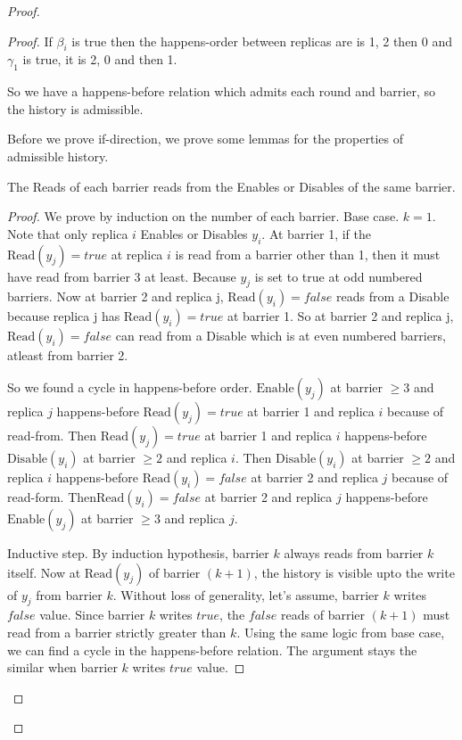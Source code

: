 \begin{proof}
\begin{proof}
    If $\beta_i$ is true then the happens-order between replicas are is 1, 2 then 0 and $\gamma_1$ is true, it is 2, 0 and then 1.

    So we have a happens-before relation which admits each round and barrier, so the history is admissible.

    Before we prove if-direction, we prove some lemmas for the properties of admissible history.

  \begin{lemma}
    \label{crdt:flag:npc-proof:lemma1}
    The \textrm{Read}s of each barrier reads from the \textrm{Enable}s or \textrm{Disable}s of the same barrier. 
  \end{lemma}

  \begin{proof}
    We prove by induction on the number of each barrier.
    Base case. $k = 1$. Note that only replica $i$ \textrm{Enable}s or \textrm{Disable}s $y_i$. At barrier 1, if the $\mathrm{Read}(y_j) = true$ at replica $i$ is read from a barrier other than 1, then it must have read from barrier 3 at least. Because $y_j$ is set to true at odd numbered barriers. Now at barrier 2 and replica j, $\mathrm{Read}(y_i) = false$ reads from a \textrm{Disable} because replica j has $\mathrm{Read}(y_i) = true$ at barrier 1. So at barrier 2 and replica j, $\mathrm{Read}(y_i) = false$ can read from a \textrm{Disable} which is at even numbered barriers, atleast from barrier 2.
    
    So we found a cycle in happens-before order. $\mathrm{Enable}(y_j)$ at barrier $\geq3$ and replica $j$ happens-before $\mathrm{Read}(y_j) = true$ at barrier 1 and replica $i$ because of read-from. Then $\mathrm{Read}(y_j) = true$ at barrier 1 and replica $i$ happens-before $\mathrm{Disable}(y_i)$ at barrier $\geq2$ and replica $i$. Then $\mathrm{Disable}(y_i)$ at barrier $\geq2$ and replica $i$ happens-before $\mathrm{Read}(y_i) = false$ at barrier 2 and replica $j$ because of read-form. Then$\mathrm{Read}(y_i) = false$ at barrier 2 and replica $j$ happens-before $\mathrm{Enable}(y_j)$ at barrier $\geq3$ and replica $j$.
    
    Inductive step. By induction hypothesis, barrier $k$ always reads from barrier $k$ itself. Now at $\mathrm{Read}(y_j)$ of barrier $(k+1)$, the history is visible upto the write of $y_j$ from barrier $k$. Without loss of generality, let's assume, barrier $k$ writes $false$ value. Since barrier $k$ writes $true$, the $false$ reads of barrier $(k+1)$ must read from a barrier strictly greater than $k$. Using the same logic from base case, we can find a cycle in the happens-before relation. The argument stays the similar when barrier $k$ writes $true$ value.
  \end{proof}


\end{proof}
\end{proof}
